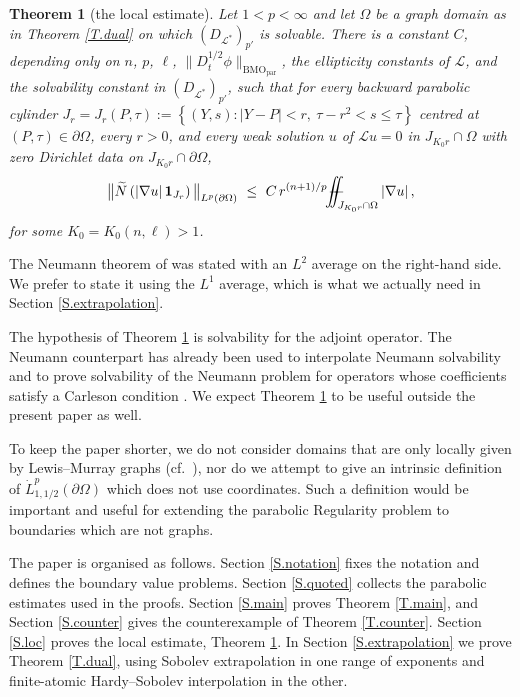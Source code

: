 \documentclass[12pt,leqno]{amsart}
\numberwithin{equation}{section}
\newcommand{\abs}[1]{\left\vert#1\right\vert}
\newcommand{\br}[1]{\left(#1\right)}
\newcommand{\set}[1]{\left\{#1\right\}}
\newcommand{\om}{\Omega}
\newcommand{\pom}{\partial\Omega}
\newcommand{\dhalf}{D_t^{1/2}}
\newcommand{\BMOpar}{\mathrm{BMO}_{\mathrm{par}}}
\newcommand{\LL}{\mathcal L}
\newcommand{\Nt}{\widetilde N}
\def\Yint#1{\mathchoice
	{\YYint\displaystyle\textstyle{#1}}%
	{\YYint\textstyle\scriptstyle{#1}}%
	{\YYint\scriptstyle\scriptscriptstyle{#1}}%
	{\YYint\scriptscriptstyle\scriptscriptstyle{#1}}%
	\!\dint}
\newcommand{\dint}{\int\!\!\!\!\!\int}
\def\YYint#1#2#3{{\setbox0=\hbox{$#1{#2#3}{\iint}$}
		\vcenter{\hbox{$#2#3$}}\kern-.51\wd0}}
\def\longdash{\mkern-1.5mu{-}\mkern-7.5mu{-}}
\def\fiint{\Yint\longdash}
\theoremstyle{plain}
\newtheorem{theorem}[equation]{Theorem}
\theoremstyle{remark}
\begin{document}
\begin{theorem}[the local estimate]\label{T.locest}
Let $1<p<\infty$ and let $\om$ be a graph domain as in Theorem \ref{T.dual}
on which $(D_{\LL^*})_{p'}$ is solvable. There is a constant $C$, depending
only on $n$, $p$, $\ell$, $\|\dhalf\phi\|_{\BMOpar}$, the ellipticity constants
of $\LL$, and the solvability constant in $(D_{\LL^*})_{p'}$, such that for
every backward parabolic cylinder
$J_r=J_r(P,\tau):=\set{(Y,s):|Y-P|<r,\ \tau-r^2<s\le\tau}$
centred at $(P,\tau)\in\pom$, every $r>0$, and every weak solution $u$ of
$\LL u=0$ in $J_{K_0r}\cap\om$ with zero Dirichlet data on $J_{K_0r}\cap\pom$,
\begin{equation}\label{E.locest}
  \big\|\Nt\br{\abs{\nabla u}\mathbf 1_{J_r}}\big\|_{L^p(\pom)}
  \ \le\ C\,r^{(n+1)/p}\,\fiint_{J_{K_0r}\cap\om}\abs{\nabla u} ,
\end{equation}
for some $K_0=K_0(n,\ell)>1$.
\end{theorem}

\noindent The Neumann theorem of \cite{DLP2} was stated with an $L^2$ average
on the right-hand side. We prefer to state it using the $L^1$ average, which is what we actually need in Section
\ref{S.extrapolation}.\medskip

The hypothesis of Theorem \ref{T.locest} is solvability for the adjoint
operator. The Neumann counterpart has already been used to interpolate
Neumann solvability \cite{DL,DLP2} and to prove solvability of the Neumann
problem for operators whose coefficients satisfy a Carleson condition
\cite{DLPN}. We expect Theorem \ref{T.locest} to be useful outside the present
paper as well.\medskip

To keep the paper shorter, we do not consider domains that are only
locally given by Lewis--Murray graphs (cf.\ \cite{DDH}), nor do we attempt to
give an intrinsic definition of $\dot L^p_{1,1/2}(\pom)$ which does not use
coordinates. Such a definition would be important and useful for extending the parabolic
Regularity problem to boundaries which are not graphs.\medskip

The paper is organised as follows. Section \ref{S.notation} fixes the
notation and defines the boundary value problems. Section \ref{S.quoted}
collects the parabolic estimates used in the proofs. Section \ref{S.main}
proves Theorem \ref{T.main}, and Section \ref{S.counter} gives the
counterexample of Theorem \ref{T.counter}. Section \ref{S.loc} proves the local
estimate, Theorem \ref{T.locest}. In Section \ref{S.extrapolation} we prove
Theorem \ref{T.dual}, using Sobolev extrapolation in one range of exponents and
finite-atomic Hardy--Sobolev interpolation in the other.\medskip
\end{document}
